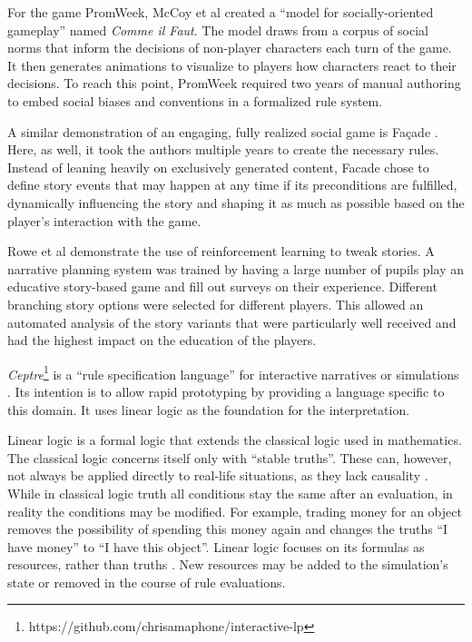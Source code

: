 For the game PromWeek, McCoy et al \cite{mccoy_2013, McCoy:2011:CIF:3014589.3014617} created a \enquote{model for socially-oriented gameplay} named \emph{Comme il Faut}.
The model draws from a corpus of social norms that inform the decisions of non-player characters each turn of the game.
It then generates animations to visualize to players how characters react to their decisions.
To reach this point, PromWeek required two years of manual authoring to embed social biases and conventions in a formalized rule system.

A similar demonstration of an engaging, fully realized social game is Fa\c{c}ade \cite{Mateas_2003}.
Here, as well, it took the authors multiple years to create the necessary rules.
Instead of leaning heavily on exclusively generated content, Facade chose to define story events that may happen at any time if its preconditions are fulfilled, dynamically influencing the story and shaping it as much as possible based on the player's interaction with the game.

Rowe et al \cite{rowe_2014} demonstrate the use of reinforcement learning to tweak stories.
A narrative planning system was trained by having a large number of pupils play an educative story-based game and fill out surveys on their experience.
Different branching story options were selected for different players.
This allowed an automated analysis of the story variants that were particularly well received and had the highest impact on the education of the players.

\emph{Ceptre}\footnote{https://github.com/chrisamaphone/interactive-lp} is a \enquote{rule specification language} for interactive narratives or simulations \cite{martens_2015}.
Its intention is to allow rapid prototyping by providing a language specific to this domain.
It uses linear logic as the foundation for the interpretation.

Linear logic is a formal logic that extends the classical logic used in mathematics.
The classical logic concerns itself only with \enquote{stable truths}.
These can, however, not always be applied directly to real-life situations, as they lack causality \cite{girard_1995}.
While in classical logic truth all conditions stay the same after an evaluation, in reality the conditions may be modified.
For example, trading money for an object removes the possibility of spending this money again and changes the truths \enquote{I have money} to \enquote{I have this object}.
Linear logic focuses on its formulas as resources, rather than truths \cite{sep-logic-linear}.
New resources may be added to the simulation's state or removed in the course of rule evaluations.

